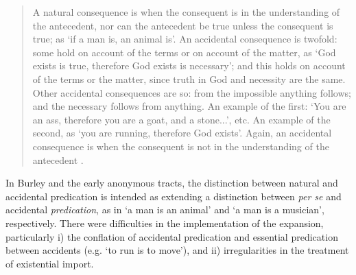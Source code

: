 \documentclass[]{article}
\begin{document}
\begin{quote}
A natural consequence is when the consequent is in the understanding of the antecedent, nor can the antecedent be true unless the consequent is true; as `if a man is, an animal is'. An accidental consequence is twofold: some hold on account of the terms or on account of the matter, as `God exists is true, therefore God exists is necessary'; and this holds on account of the terms or the matter, since truth in God and necessity are the same. Other accidental consequences are so: from the impossible anything follows; and the necessary follows from anything. An example of the first: `You are an ass, therefore you are a goat, and a stone...', etc. An example of the second, as `you are running, therefore God exists'. Again, an accidental consequence is when the consequent is not in the understanding of the antecedent \autocite[128-129, par. 70]{Green-Pedersen1980b}.
\end{quote}

In Burley and the early anonymous tracts, the distinction between natural and accidental predication is intended as extending a distinction between \textit{per se} and accidental \textit{predication}, as in `a man is an animal' and `a man is a musician', respectively. There were difficulties in the implementation of the expansion, particularly i) the conflation of accidental predication and essential predication between accidents (e.g. `to run is to move'), and ii) irregularities in the treatment of existential import.\autocite[76-79]{Archambault2017d}
\end{document}
